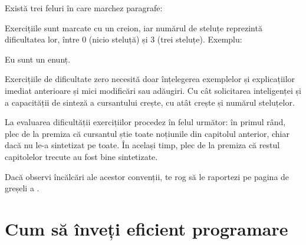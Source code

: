 Există trei feluri în care marchez paragrafe:




Exercițiile sunt marcate cu un creion, iar numărul de steluțe reprezintă dificultatea lor, între 0 (nicio steluță)
și 3 (trei steluțe). Exemplu:
\begin{Exercise*}[title={Exercițiu de dificultate 1},difficulty=1]
	Eu sunt un enunț.
\end{Exercise*}

Exercițiile de dificultate zero necesită doar înțelegerea exemplelor și
explicațiilor imediat anterioare și mici modificări sau adăugiri.
Cu cât solicitarea inteligenței și a capacității de sinteză a cursantului
crește, cu atât crește și numărul steluțelor.

La evaluarea dificultății exercițiilor procedez în
felul următor: în primul rând, plec de la premiza că
cursantul știe toate noțiunile din capitolul anterior,
chiar dacă nu le-a sintetizat pe toate. În același timp,
plec de la premiza că restul capitolelor trecute
au fost bine sintetizate.



Dacă observi încălcări ale acestor convenții, te rog să le
raportezi pe pagina de greșeli a \phpro.
{}
\section*{Cum să înveți eficient programare}

